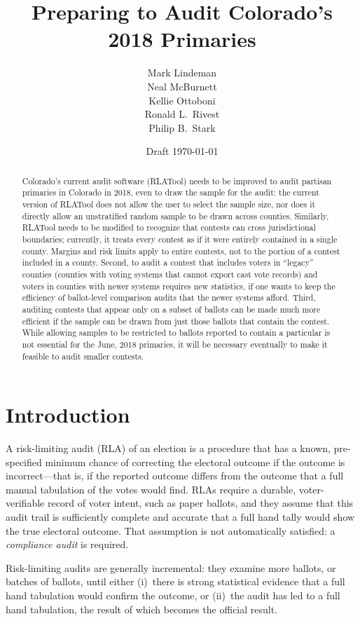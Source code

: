 \documentclass[12pt]{article}
\title{Preparing to Audit Colorado's 2018 Primaries}
\author{
   Mark Lindeman\\
   Neal McBurnett\\
   Kellie Ottoboni\\
   Ronald L.~Rivest\\
   Philip B.~Stark
}
\date{Draft \today}
\begin{document}
\maketitle


\begin{abstract}
Colorado's current audit software (RLATool) needs to be improved to audit partisan 
primaries in Colorado in 2018, even to draw the sample for the audit:
the current version of RLATool does not allow the user to select the sample size, nor does
it directly allow an unstratified random sample to be drawn across counties.
Similarly, RLATool needs to be modified to recognize that contests can cross jurisdictional
boundaries; currently, it treats every contest as if it were entirely
contained in a single county.
Margins and risk limits apply to entire contests, not to the portion of a contest
included in a county.
Second, to audit a contest that includes voters in ``legacy'' counties 
(counties with voting systems that cannot export cast vote records) 
and voters in counties with newer systems requires new statistics, if one wants to
keep the efficiency of ballot-level comparison audits that the newer systems
afford.
Third, auditing contests that appear only on a subset of ballots can
be made much more efficient if the sample can be drawn from just those ballots
that contain the contest.
While allowing samples to be restricted to ballots reported to contain a particular
is not essential for the June, 2018 primaries, it will be necessary
eventually to make it feasible to audit smaller contests.
\end{abstract}

\section{Introduction}
A risk-limiting audit (RLA) of an election is a procedure that
has a known, pre-specified minimum chance of correcting the electoral outcome if the outcome
is incorrect---that is, if the reported outcome differs from the outcome that a full manual
tabulation of the votes would find. 
RLAs require a durable, voter-verifiable record of voter intent, such as paper ballots,
and they assume that this audit trail is sufficiently complete and accurate that a full hand
tally would show the true electoral outcome.
That assumption is not automatically satisfied: a \emph{compliance audit} is required.

Risk-limiting audits are generally incremental: they examine more ballots, or batches of ballots,
until either (i)~there is strong statistical evidence that a full hand tabulation would confirm the outcome,
or (ii)~the audit has led to a full hand tabulation, the result of which becomes the official
result.
\end{document}
